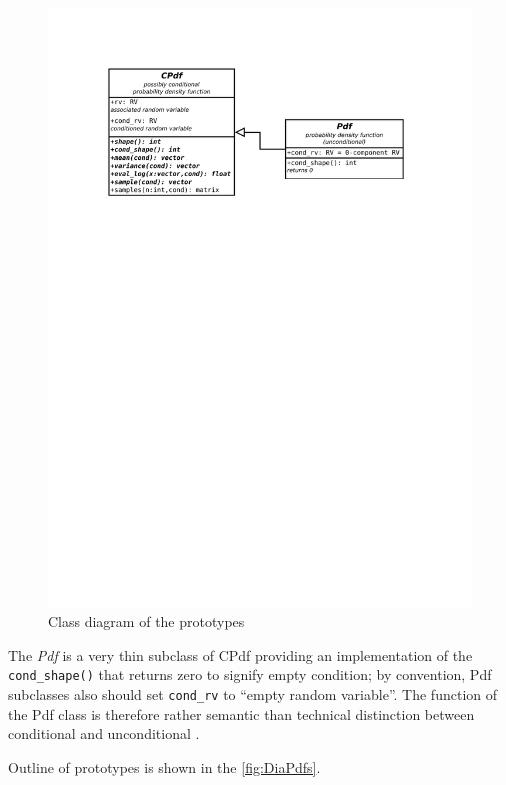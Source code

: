 \begin{figure}[h]
	\centering
	\includegraphics[width=\textwidth,keepaspectratio=true,clip=true,trim=3cm 204mm 3cm 3cm]{./diagrams/pdfs.pdf}
	\vspace{-8mm}
	\caption{Class diagram of the {\pdf} prototypes}
	\label{fig:DiaPdfs}
\end{figure}

The \emph{Pdf} is a very thin subclass of CPdf providing an implementation of the \verb|cond_shape()|
that returns zero to signify empty condition; by convention, Pdf subclasses also should set
\verb|cond_rv| to ``empty random variable''. The function of the Pdf class is therefore rather
semantic than technical distinction between conditional and unconditional {\pdfs}.

Outline of {\pdf} prototypes is shown in the \autoref{fig:DiaPdfs}.


